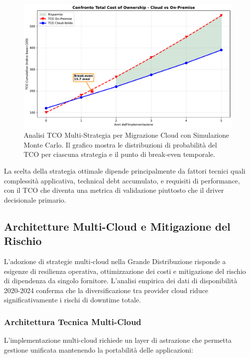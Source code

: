 \begin{figure}[htbp]
\centering
\includegraphics[width=\textwidth]{thesis_figures/cap3/fig_3_4_tco_comparison.pdf}
\caption{Analisi TCO Multi-Strategia per Migrazione Cloud con Simulazione Monte Carlo. Il grafico mostra le distribuzioni di probabilità del TCO per ciascuna strategia e il punto di break-even temporale.}
\label{fig:cloud_tco}
\end{figure}

La scelta della strategia ottimale dipende principalmente da fattori tecnici quali complessità applicativa, technical debt accumulato, e requisiti di performance, con il TCO che diventa una metrica di validazione piuttosto che il driver decisionale primario.%


\subsection{Architetture Multi-Cloud e Mitigazione del Rischio}

L'adozione di strategie multi-cloud nella Grande Distribuzione risponde a esigenze di resilienza operativa, ottimizzazione dei costi e mitigazione del rischio di dipendenza da singolo fornitore. L'analisi empirica dei dati di disponibilità 2020-2024\autocite{Uptime2024} conferma che la diversificazione tra provider cloud riduce significativamente i rischi di downtime totale.

\subsubsection{Architettura Tecnica Multi-Cloud}

L'implementazione multi-cloud richiede un layer di astrazione che permetta gestione unificata mantenendo la portabilità delle applicazioni:


